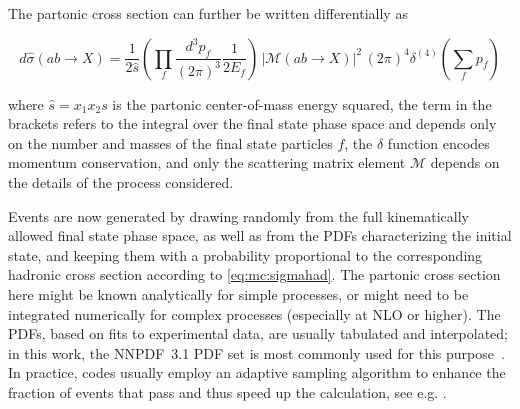 
The partonic cross section can further be written differentially as~\cite{Peskin:1995ev}

\begin{equation}
    d \hat{\sigma} (a b \rightarrow X) = \frac{1}{2 \hat{s}} \left( \prod_f \frac{d^3 p_f}{(2\pi)^3} \frac{1}{2 E_f} \right) \, \left| \mathcal{M} (a b \rightarrow 
    X ) \right|^2 \, (2\pi)^4 \delta^{(4)} \left( \sum_f p_f \right)
\end{equation}

\noindent where $\hat{s} = x_1 x_2 s$ is the partonic center-of-mass energy squared, the term in the brackets refers to the integral over the final state phase space and depends only on the number and masses of the final state particles $f$, the $\delta$ function encodes momentum conservation, and only the scattering matrix element $\mathcal{M}$ depends on the details of the process considered.

Events are now generated by drawing randomly from the full kinematically allowed final state phase space, as well as from the PDFs characterizing the initial state, and keeping them with a probability proportional to the corresponding hadronic cross section according to \cref{eq:mc:sigmahad}. The partonic cross section here might be known analytically for simple processes, or might need to be integrated numerically for complex processes (especially at NLO or higher). The PDFs, based on fits to experimental data, are usually tabulated and interpolated; in this work, the NNPDF~3.1 PDF set is most commonly used for this purpose~\cite{NNPDF:2017mvq}. In practice, codes usually employ an adaptive sampling algorithm to enhance the fraction of events that pass and thus speed up the calculation, see e.g. .

